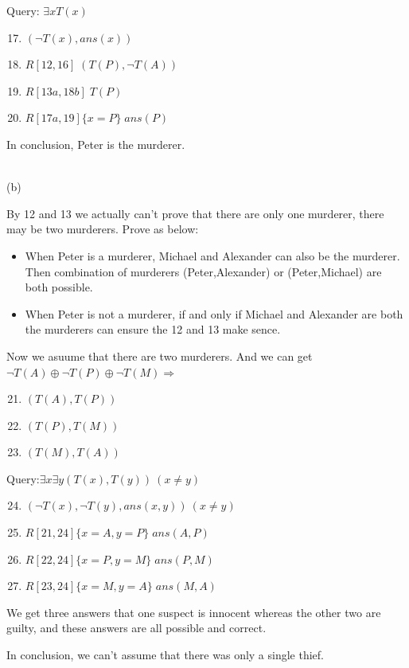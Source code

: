 \documentclass[a4paper, 11pt]{article}
\begin{document}
Query: $ \exists xT(x) $

\begin{enumerate}
	\setcounter{enumi}{16}
	\item $ (\lnot T(x),ans(x)) $
	\item $ R[12,16] \;(T(P),\lnot T(A))$
	\item $ R[13a,18b] \;T(P)$
	\item $ R[17a,19] \{x=P\} \;ans(P)$
\end{enumerate}

In conclusion, Peter is the murderer.

~\\
(b)

By 12 and 13 we actually can't prove that there are only one murderer, there may be two murderers. Prove as below:
\begin{itemize}
	\item When Peter is a murderer, Michael and Alexander can also be the murderer. Then combination of murderers (Peter,Alexander) or (Peter,Michael) are both possible.
	\item When Peter is not a murderer, if and only if Michael and Alexander are both the murderers can ensure the 12 and 13 make sence.
\end{itemize}

Now we asuume that there are two murderers. And we can get $\lnot T(A) \oplus \lnot T(P) \oplus \lnot T(M) 	\Rightarrow $
\begin{enumerate}
	\setcounter{enumi}{20}
	\item $ (T(A), T(P)) $
	\item $ (T(P), T(M)) $
	\item $ (T(M), T(A)) $
\end{enumerate}
Query:$ \exists x \exists y (T(x),T(y)) \ (x \ne y)$
\begin{enumerate}
	\setcounter{enumi}{23}
	\item $ (\lnot T(x), \lnot T(y), ans(x,y)) \ (x \ne y) $
	\item $ R[21,24] \{x=A,y=P\} \;ans(A,P)$
	\item $ R[22,24] \{x=P,y=M\} \;ans(P,M)$
	\item $ R[23,24] \{x=M,y=A\} \;ans(M,A)$
\end{enumerate}

	We get three answers that one suspect is innocent whereas the other two are guilty, and these answers are all possible and correct.

	In conclusion, we can't assume that there was only a single thief.
%

%
%
\end{document}
